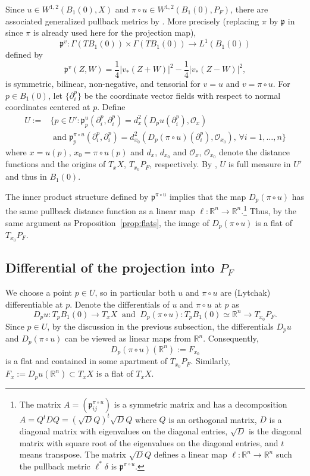 \documentclass[12pt]{amsart}
\theoremstyle{definition}
\numberwithin{equation}{section}
\newcommand{\R}{\mathbb R}
\newcommand{\PF}{P_F}
\begin{document}
Since $u\in W^{1,2}(B_1(0),X)$ and $\pi \circ u \in W^{1,2}(B_1(0),\PF)$, there are associated generalized pullback metrics   by \cite[Theorem 2.3.2]{korevaar-schoen1}.  More precisely (replacing $\pi$ by $\mathfrak p$ in \cite[Theorem 2.3.2]{korevaar-schoen1} since $\pi$ is already used here for the projection map),  
\[
\mathfrak p^v: \Gamma(TB_1(0)) \times \Gamma(TB_1(0)) \rightarrow L^1(B_1(0))
\]
defined by 
\[
\mathfrak p^v(Z,W) =\frac{1}{4} |v_*(Z+W)|^2-\frac{1}{4} |v_*(Z-W)|^2, 
\]
is  symmetric, bilinear, non-negative, and tensorial for $v=u$ and $v= \pi \circ u$.  For $p \in B_1(0)$,  let $\{\partial_i^p\}$ be the coordinate vector fields  with respect to normal coordinates centered at $p$.   Define
\begin{align*}
U:=&\{p \in U': \mathfrak p_p^u(\partial_i^p, \partial_i^p) = d^2_{x}(D_pu(\partial_i^p), \mathcal O_{x})\\
&\text{ and } \mathfrak p_p^{\pi \circ u}(\partial_i^p, \partial_i^p) = d^2_{x_0}(D_p(\pi \circ u)(\partial_i^p), \mathcal O_{x_0}), \, \forall i=1,\dots, n\}
\end{align*}
where $x = u(p)$, $x_0=\pi \circ u(p)$ and $d_x$, $d_{x_0}$ and $\mathcal O_x$, $\mathcal O_{x_0}$ denote  the distance functions and the origins of $T_xX$, $T_{x_0}\PF$, respectively.  By \cite[Lemma 1.9.5]{korevaar-schoen1}, $U$ is full measure in $U'$ and thus in $B_1(0)$.


The  inner product structure defined by $\mathfrak p^{\pi \circ u}$ implies that the map $D_p(\pi \circ u)$ has the same pullback distance function as a linear map $\ell:\R^n \rightarrow \R^n$.\footnote{The matrix $A=(\mathfrak p^{\pi \circ u}_{ij})$ is a symmetric matrix and  has a decomposition $A=Q^t D Q= (\sqrt{D}Q)^t \sqrt{D} Q$ where $Q$ is an orthogonal matrix, $D$ is a diagonal matrix with eigenvalues on the diagonal entries, $\sqrt{D}$ is the diagonal matrix with square root of the eigenvalues on the diagonal entries, and $t$ means transpose.  The matrix $\sqrt{D}Q$ defines a linear map $\ell:\R^n \rightarrow \R^n$ such the pullback metric $\ell^*\delta$ is $\mathfrak p^{\pi \circ u}$.} Thus, by the same argument as Proposition~\ref{prop:flats},  the image of $D_p(\pi \circ u)$ is a flat of $T_{x_0}\PF$.

  \subsection{Differential of the projection into $P_F$}
We choose a point $p \in U$, so in particular both $u$ and  $\pi \circ u$  are (Lytchak) differentiable at $p$. Denote the differentials of $u$ and $\pi \circ u$ at $p$ as
\[
D_pu: T_pB_1(0) \to T_xX \ \mbox{ and } \ D_p(\pi \circ u): T_pB_1(0) \simeq \mathbb R^n \to T_{x_0}P_F.
\]
Since $p \in U$, by the discussion in the previous subsection, the differentials $D_pu$ and $D_p(\pi\circ u)$ can be viewed as linear maps from  $\mathbb{R}^n$.  Consequently, 
\[
D_p(\pi \circ u)(\R^n):=F_{x_0}
\] 
 is a flat and contained in some apartment  of $T_{x_0}P_F$.
Similarly, $F_x:=D_p u(\mathbb R^n) \subset T_xX$ is a flat of $T_xX$.
\end{document}
